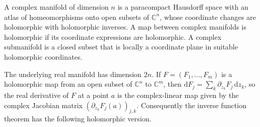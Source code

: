 \begin{definition}\label{def:complex-manifold}
A complex manifold of dimension $n$ is a paracompact Hausdorff space with an atlas of homeomorphisms onto open subsets of $\mathbb{C}^n$, whose coordinate changes are holomorphic with holomorphic inverses. A map between complex manifolds is holomorphic if its coordinate expressions are holomorphic. A complex submanifold is a closed subset that is locally a coordinate plane in suitable holomorphic coordinates.
\end{definition}
The underlying real manifold has dimension $2n$. If $F=(F_1,\ldots,F_m)$ is a holomorphic map from an open subset of $\mathbb C^n$ to $\mathbb C^m$, then $\mathrm dF_j=\sum_k\partial_{z_k}F_j\,\mathrm dz_k$, so the real derivative of $F$ at a point $a$ is the complex-linear map given by the complex Jacobian matrix $(\partial_{z_k}F_j(a))_{j,k}$. Consequently the inverse function theorem has the following holomorphic version.

